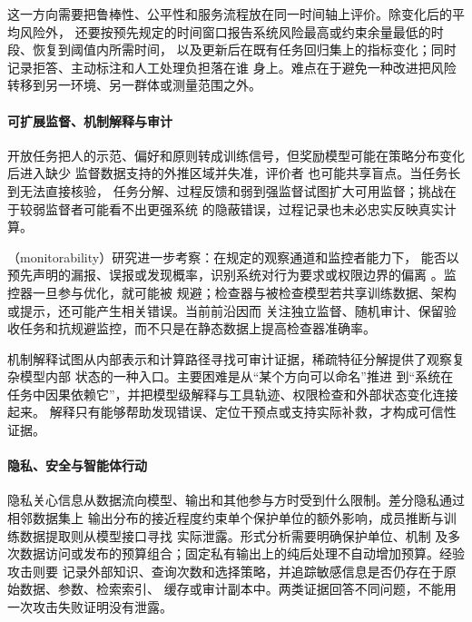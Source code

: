这一方向需要把鲁棒性、公平性和服务流程放在同一时间轴上评价。除变化后的平均风险外，
还要按预先规定的时间窗口报告系统风险最高或约束余量最低的时段、恢复到阈值内所需时间，
以及更新后在既有任务回归集上的指标变化；同时记录拒答、主动标注和人工处理负担落在谁
身上。难点在于避免一种改进把风险转移到另一环境、另一群体或测量范围之外。

\paragraph{可扩展监督、机制解释与审计}

开放任务把人的示范、偏好和原则转成训练信号，但奖励模型可能在策略分布变化后进入缺少
监督数据支持的外推区域并失准，评价者
也可能共享盲点。当任务长到无法直接核验，
任务分解、过程反馈和弱到强监督试图扩大可用监督；挑战在于较弱监督者可能看不出更强系统
的隐蔽错误，过程记录也未必忠实反映真实计算。

（monitorability）研究进一步考察：在规定的观察通道和监控者能力下，
能否以预先声明的漏报、误报或发现概率，识别系统对行为要求或权限边界的偏离
。监控器一旦参与优化，就可能被
规避；检查器与被检查模型若共享训练数据、架构或提示，还可能产生相关错误。当前前沿因而
关注独立监督、随机审计、保留验收任务和抗规避监控，而不只是在静态数据上提高检查器准确率。

机制解释试图从内部表示和计算路径寻找可审计证据，稀疏特征分解提供了观察复杂模型内部
状态的一种入口。主要困难是从“某个方向可以命名”推进
到“系统在任务中因果依赖它”，并把模型级解释与工具轨迹、权限检查和外部状态变化连接起来。
解释只有能够帮助发现错误、定位干预点或支持实际补救，才构成可信性证据。

\paragraph{隐私、安全与智能体行动}

隐私关心信息从数据流向模型、输出和其他参与方时受到什么限制。差分隐私通过相邻数据集上
输出分布的接近程度约束单个保护单位的额外影响，成员推断与训练数据提取则从模型接口寻找
实际泄露。形式分析需要明确保护单位、机制
及多次数据访问或发布的预算组合；固定私有输出上的纯后处理不自动增加预算。经验攻击则要
记录外部知识、查询次数和选择策略，并追踪敏感信息是否仍存在于原始数据、参数、检索索引、
缓存或审计副本中。两类证据回答不同问题，不能用一次攻击失败证明没有泄露。

